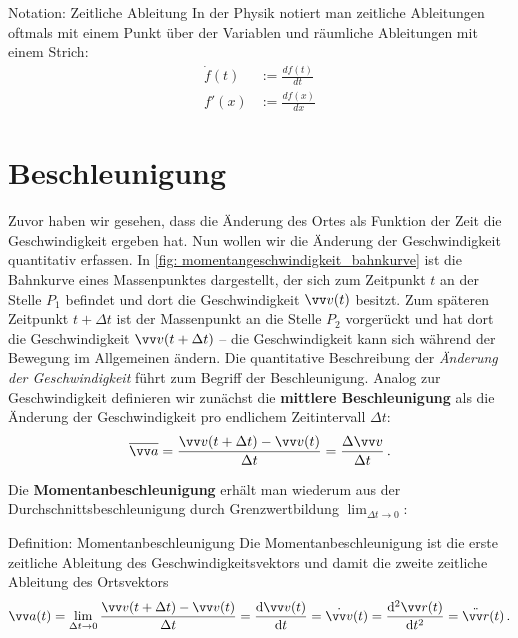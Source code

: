 \begin{rememberbox}[]{Notation: Zeitliche Ableitung}
    In der Physik notiert man zeitliche Ableitungen oftmals mit einem Punkt über der Variablen und räumliche Ableitungen mit einem Strich:
    \begin{align*}
        \dot{f}(t) &:= \frac{df(t)}{dt} \\
        f'(x) &:= \frac{df(x)}{dx}
    \end{align*}
\end{rememberbox}

\section{Beschleunigung}\label{sec: beschleunigung}
Zuvor haben wir gesehen, dass die Änderung des Ortes als Funktion der Zeit die Geschwindigkeit ergeben hat. Nun wollen wir die Änderung der Geschwindigkeit quantitativ erfassen. In \cref{fig: momentangeschwindigkeit_bahnkurve} ist die Bahnkurve eines Massenpunktes dargestellt, der sich zum Zeitpunkt $t$ an der Stelle $P_1$ befindet und dort die Geschwindigkeit $\ivec{v}(t)$ besitzt. Zum späteren Zeitpunkt $t+\Delta t$ ist der Massenpunkt an die Stelle $P_2$ vorgerückt und hat dort die Geschwindigkeit $\ivec{v}(t+\Delta t)$ -- die Geschwindigkeit kann sich während der Bewegung im Allgemeinen ändern. Die quantitative Beschreibung der \textit{Änderung der Geschwindigkeit} führt zum Begriff der Beschleunigung. Analog zur Geschwindigkeit definieren wir zunächst die \textbf{mittlere Beschleunigung} als die Änderung der Geschwindigkeit pro endlichem Zeitintervall $\Delta t$:
\begin{equation}\label{eq: definition_durchschnittsbeschleunigung}
    \overline{\ivec{a}} = \frac{\ivec{v}(t+\Delta t)-\ivec{v}(t)}{\Delta t} = \frac{\Delta\ivec{v}}{\Delta t} \mDot
\end{equation}

Die \textbf{Momentanbeschleunigung} erhält man wiederum aus der Durchschnittsbeschleunigung durch Grenzwertbildung $\lim_{\Delta t \to 0}$:

\begin{importantbox}{Definition: Momentanbeschleunigung}
    Die Momentanbeschleunigung ist die erste zeitliche Ableitung des Geschwindigkeitsvektors und damit die zweite zeitliche Ableitung des Ortsvektors
    \begin{equation}\label{eq: definition_momentanbeschleunigung}
        \ivec{a}(t) = \lim_{\Delta t\to 0}\frac{\ivec{v}(t+\Delta t)-\ivec{v}(t)}{\Delta t} = \frac{\dd \ivec{v}(t)}{\dd t} = \dot{\ivec{v}}(t) = \frac{\dd^2 \ivec{r}(t)}{\dd t^2} = \ddot{\ivec{r}}(t)\mDot
    \end{equation}
\end{importantbox}

